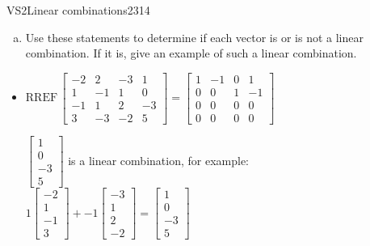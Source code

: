 \begin{exercise}{VS2}{Linear combinations}{2314}
\begin{exerciseStatement}
\begin{enumerate}[(a)]
\begin{itemize}
 
\end{itemize}

     
\item  

 Use these statements to determine if each vector is or is not a linear combination. If it is, give an example of such a linear combination. 

 
\end{enumerate}

     \end{exerciseStatement}
 \begin{exerciseAnswer} 

\begin{itemize}
\item  

 \(
\mathrm{RREF}\, \left[\begin{array}{ccc|c}
-2 & 2 & -3 & 1 \\
1 & -1 & 1 & 0 \\
-1 & 1 & 2 & -3 \\
3 & -3 & -2 & 5
\end{array}\right] = \left[\begin{array}{ccc|c}
1 & -1 & 0 & 1 \\
0 & 0 & 1 & -1 \\
0 & 0 & 0 & 0 \\
0 & 0 & 0 & 0
\end{array}\right]
                        \) 

 

 \(\left[\begin{array}{c}
1 \\
0 \\
-3 \\
5
\end{array}\right]\) is a linear combination, for example: \(
1 \left[\begin{array}{c}
-2 \\
1 \\
-1 \\
3
\end{array}\right] + -1 \left[\begin{array}{c}
-3 \\
1 \\
2 \\
-2
\end{array}\right] = \left[\begin{array}{c}
1 \\
0 \\
-3 \\
5
\end{array}\right]
                            \) 


\end{itemize}
\end{exerciseAnswer}
\end{exercise}

